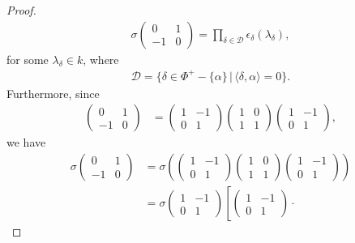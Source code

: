 \begin{proof}
\begin{align*}
\sigma\left(\begin{matrix}0 & 1\\-1 & 0\end{matrix}\right) = \prod_{\delta\in\mathcal{D}} \epsilon_\delta(\lambda_\delta),
\end{align*}
for some $\lambda_\delta\in k$, where
\begin{align*}
	\mathcal{D} = \{\delta\in \Phi^+-\{\alpha\}\,|\,\langle\delta,\alpha\rangle = 0\}.
\end{align*}
Furthermore, since
\begin{align*}
\left(\begin{matrix} 0 & 1\\ -1 & 0\end{matrix}\right)
&=
\left(\begin{matrix} 1 & -1\\ 0 & 1\end{matrix}\right)
\left(\begin{matrix} 1 & 0\\ 1 & 1\end{matrix}\right)
\left(\begin{matrix} 1 & -1\\ 0 & 1\end{matrix}\right),
\end{align*}
we have
\begin{align*}
	\sigma
		\left(\begin{matrix} 0 & 1\\ -1 & 0\end{matrix}\right)
	&=
	\sigma\left(
		\left(\begin{matrix} 1 & -1\\ 0 & 1\end{matrix}\right)
		\left(\begin{matrix} 1 & 0\\ 1 & 1\end{matrix}\right)
		\left(\begin{matrix} 1 & -1\\ 0 & 1\end{matrix}\right)
	\right) \\
	&=
	\sigma
		\left(\begin{matrix} 1 & -1\\ 0 & 1\end{matrix}\right)
	\left[
		\left(\begin{matrix} 1 & -1\\ 0 & 1\end{matrix}\right)\cdot

\end{align*}
\end{proof}
